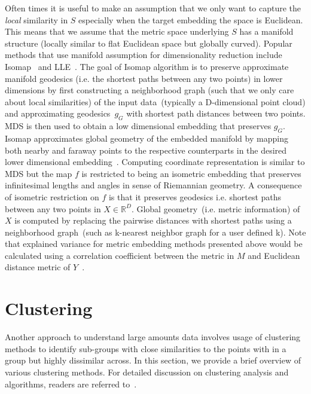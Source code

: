 Often times it is useful to make an assumption that we only want to capture the \textit{local} similarity in \(S\) especially when the target embedding the space is Euclidean.
This means that we assume that the metric space underlying \(S\) has a manifold structure (locally similar to flat Euclidean space but globally curved).
Popular methods that use manifold assumption for dimensionality reduction include Isomap~\cite{Isomap} and LLE~\cite{LLE}. 
The goal of Isomap algorithm is to preserve approximate manifold geodesics (i.e. the shortest paths between any two points) in lower dimensions by first constructing a neighborhood graph (such that we only care about local similarities) of the input data~(typically a D-dimensional point cloud) and approximating geodesics~\(g_G\) with shortest path distances between two points. 
MDS is then used to obtain a low dimensional embedding that preserves \(g_G\). 
Isomap approximates global geometry of the embedded manifold by mapping both nearby and faraway points to the respective counterparts in the desired lower dimensional embedding~\cite{IsomapV2}. 
Computing coordinate representation is similar to MDS but the map \(f\) is restricted to being an isometric embedding that preserves infinitesimal lengths and angles in sense of Riemannian geometry. 
A consequence of isometric restriction on \(f\) is that it preserves geodesics i.e. shortest paths between any two points in \(X \in\mathbb{R}^D\). 
Global geometry~(i.e. metric information) of \(X\) is computed by replacing the pairwise distances with shortest paths using a neighborhood graph~(such as k-nearest neighbor graph for a user defined k).
Note that explained variance for metric embedding methods presented above would be calculated using a correlation coefficient between the metric in \(M\) and Euclidean distance metric of \(Y\)~\cite{Isomap}.

\section{Clustering}
Another approach to understand large amounts data involves usage of clustering methods to identify sub-groups with close similarities to the points with in a group but highly dissimilar across. 
In this section, we provide a brief overview of various clustering methods. 
For detailed discussion on clustering analysis and algorithms, readers are referred to~\cite{ESL}. 

